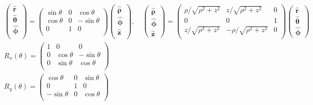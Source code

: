\documentclass[10pt]{article}
\newcommand{\rhat}{\boldsymbol{\hat{\textbf{r}}}}
\newcommand{\zhat}{\boldsymbol{\hat{\textbf{z}}}}
\newcommand{\phihat}{\boldsymbol{\hat{\textbf{$\phi$}}}}
\newcommand{\thetahat}{\boldsymbol{\hat{\textbf{$\theta$}}}}
\newcommand{\rhohat}{\boldsymbol{\hat{\textbf{$\rho$}}}}
\begin{document}
\begin{multicols}{2}
\begin{align*}
 		& \begin{pmatrix}
 			\rhat \\
 			\thetahat \\
 			\phihat \\
 		\end{pmatrix} = 
 		\begin{pmatrix}
 			\sin \theta & 0 & \cos \theta \\
 			\cos \theta & 0 & -\sin \theta \\
 			0 & 1 & 0 \\
 		\end{pmatrix}
 		\begin{pmatrix}
 			\rhohat \\
 			\phihat \\
 			\zhat \\
 		\end{pmatrix}, \quad 
 		\begin{pmatrix}
			\rhohat \\
			\phihat \\
			\zhat
 		\end{pmatrix} = 
 		\begin{pmatrix}
 			\rho / \sqrt{\rho^2 + z^2} & z / \sqrt{\rho^2 + z^2} & 0 \\
 			0 & 0 & 1 \\
 			z / \sqrt{\rho^2 + z^2} & - \rho /\sqrt{\rho^2 + z^2} & 0 \\
 		\end{pmatrix}
 		\begin{pmatrix}
			\rhat \\
			\thetahat \\
			\phihat
 		\end{pmatrix} \\
 		& R_x(\theta) = \begin{pmatrix}
	 		1 & 0 & 0 \\
	 		0 & \cos \theta & -\sin \theta \\
	 		0 & \sin \theta & \cos \theta \\
 		\end{pmatrix}	\tag*{Rotation matrix about x-axis} \\
 		& R_y (\theta) = \begin{pmatrix}
 			\cos \theta & 0 & \sin \theta \\
 			0 & 1 & 0 \\
 			-\sin \theta & 0 & \cos \theta \\
 		\end{pmatrix} \tag*{Rotation matrix about y-axis} \\

\end{align*}
\end{multicols}
\end{document}

